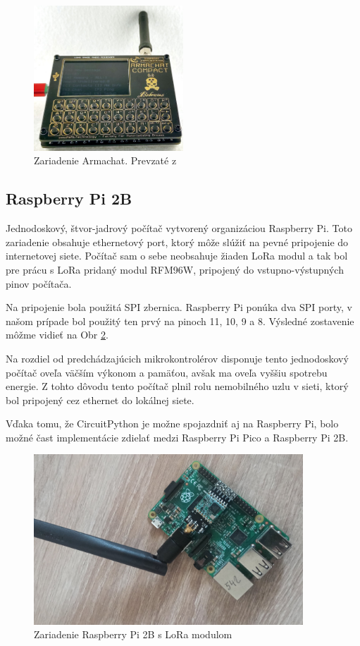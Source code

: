 \documentclass[slovak,master]{diploma}
\begin{document}
\begin{figure}[h!]
	\centering
	\includegraphics[width=0.5\textwidth]{Figures/armachat.jpg}
	\caption[Zariadenie Armachat]{Zariadenie Armachat. Prevzaté z \cite{armachatObr}}
	\label{fig:armachat}
\end{figure}
\newpage

\subsection{Raspberry Pi 2B}
Jednodoskový, štvor-jadrový počítač vytvorený organizáciou Raspberry Pi. 
Toto zariadenie obsahuje ethernetový port, ktorý môže slúžiť na pevné pripojenie do internetovej siete.
Počítač sam o sebe neobsahuje žiaden LoRa modul a tak bol pre prácu s LoRa pridaný modul RFM96W, pripojený do vstupno-výstupných pinov počítača.

Na pripojenie bola použitá SPI zbernica. Raspberry Pi ponúka dva SPI porty, v našom prípade bol použitý ten prvý na pinoch 11, 10, 9 a 8. 
Výsledné zostavenie môžme vidieť na Obr \ref{fig:rpi2b}.

Na rozdiel od predchádzajúcich mikrokontrolérov disponuje tento jednodoskový počítač oveľa väčším výkonom a pamäťou, 
avšak ma oveľa vyššiu spotrebu energie. Z tohto dôvodu tento počítač plnil rolu nemobilného uzlu v sieti, ktorý bol pripojený cez ethernet do lokálnej siete.

Vďaka tomu, že CircuitPython je možne spojazdniť aj na Raspberry Pi, bolo možné čast implementácie zdielať medzi Raspberry Pi Pico a Raspberry Pi 2B.

\begin{figure}[h!]
	\centering
	\includegraphics[width=0.9\textwidth]{Figures/rpi2b.jpg}
	\caption{Zariadenie Raspberry Pi 2B s LoRa modulom}
	\label{fig:rpi2b}
\end{figure}
\end{document}
